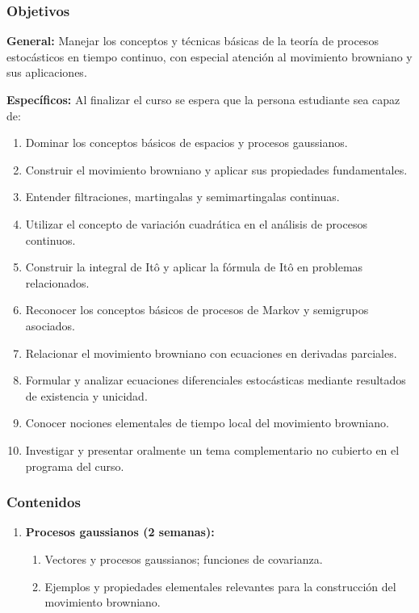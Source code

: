 \begin{refsection}
\subsubsection*{Objetivos}

\textbf{General:} Manejar los conceptos y técnicas básicas de la teoría de procesos estocásticos en tiempo continuo, con especial atención al movimiento browniano y sus aplicaciones.

\textbf{Específicos:} Al finalizar el curso se espera que la persona estudiante sea capaz de:

\begin{enumerate}
\item Dominar los conceptos básicos de espacios y procesos gaussianos.
\item Construir el movimiento browniano y aplicar sus propiedades fundamentales.
\item Entender filtraciones, martingalas y semimartingalas continuas.
\item Utilizar el concepto de variación cuadrática en el análisis de procesos continuos.
\item Construir la integral de Itô y aplicar la fórmula de Itô en problemas relacionados.
\item Reconocer los conceptos básicos de procesos de Markov y semigrupos asociados.
\item Relacionar el movimiento browniano con ecuaciones en derivadas parciales.
\item Formular y analizar ecuaciones diferenciales estocásticas mediante resultados de existencia y unicidad.
\item Conocer nociones elementales de tiempo local del movimiento browniano.
\item Investigar y presentar oralmente un tema complementario no cubierto en el programa del curso.
\end{enumerate}

\subsubsection*{Contenidos}

\begin{enumerate}

\item \textbf{Procesos gaussianos (2 semanas):}
\begin{enumerate}
    \item Vectores y procesos gaussianos; funciones de covarianza.
    \item Ejemplos y propiedades elementales relevantes para la construcción del movimiento browniano.
\end{enumerate}


\end{enumerate}
\end{refsection}
